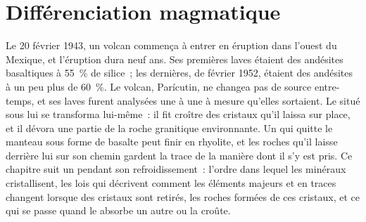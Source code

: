 \chapter{Différenciation magmatique}\label{ch:b2:magmatic-differentiation}

Le 20 février 1943, un volcan commença à entrer en éruption dans l'ouest du Mexique, et
l'éruption dura neuf ans. Ses premières laves étaient des andésites basaltiques à \qty{55}{\percent}
de silice~; les dernières, de février 1952, étaient des andésites à un peu plus de
\qty{60}{\percent}. Le volcan, Parícutin, ne changea pas de source entre-temps, et ses laves furent
analysées une à une à mesure qu'elles sortaient. Le  situé sous lui se transforma
lui-même~: il fit croître des cristaux qu'il laissa sur place, et il dévora une partie
de la roche granitique environnante. Un  qui quitte le manteau sous forme de basalte peut
finir en rhyolite, et les roches qu'il laisse derrière lui sur son chemin gardent la trace
de la manière dont il s'y est pris. Ce chapitre suit un  pendant son refroidissement~: l'ordre
dans lequel les minéraux cristallisent, les lois qui décrivent comment les éléments majeurs et en traces
changent lorsque des cristaux sont retirés, les roches formées de ces cristaux, et ce qui se passe
quand le  absorbe un autre  ou la croûte.

